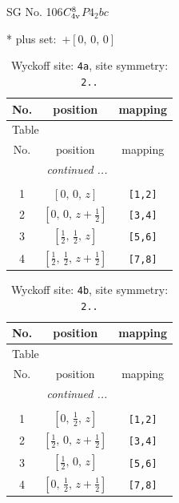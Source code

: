 \documentclass[fleqn,8pt]{jsarticle}
\begin{document}
\setcounter{MaxMatrixCols}{32}

\renewcommand{\tablename}{Table~}
\renewcommand{\figurename}{Figure~}
\begin{center}
\LARGE
SG No. 106\quad$C_{\rm 4v}^{8}$\quad$P4_2bc$\quad[ tetragonal ]
\end{center}
* plus set:\,\,\,$+\left[ 0,\, 0,\, 0 \right]$
\renewcommand{\arraystretch}{1.2}
\begin{longtable}{ccc}
\caption{Wyckoff site: {\tt 4a}, site symmetry: {\tt 2..}}
 \\
 \hline \hline
No. & position & mapping \\ \hline \endfirsthead

\multicolumn{2}{l}{\tablename\ \thetable{}} \\
 \hline \hline
No. & position & mapping \\ \hline \endhead

 \hline \hline
\multicolumn{2}{r}{\footnotesize\it continued ...} \\ \endfoot

 \hline \hline
\multicolumn{2}{r}{} \\ \endlastfoot

1 & $\left[ 0,\, 0,\, z \right]$ & {\tt [1,2]} \\ \hline
2 & $\left[ 0,\, 0,\, z + \frac{1}{2} \right]$ & {\tt [3,4]} \\ \hline
3 & $\left[ \frac{1}{2},\, \frac{1}{2},\, z \right]$ & {\tt [5,6]} \\ \hline
4 & $\left[ \frac{1}{2},\, \frac{1}{2},\, z + \frac{1}{2} \right]$ & {\tt [7,8]} \\
\end{longtable}
\renewcommand{\arraystretch}{1.2}
\begin{longtable}{ccc}
\caption{Wyckoff site: {\tt 4b}, site symmetry: {\tt 2..}}
 \\
 \hline \hline
No. & position & mapping \\ \hline \endfirsthead

\multicolumn{2}{l}{\tablename\ \thetable{}} \\
 \hline \hline
No. & position & mapping \\ \hline \endhead

 \hline \hline
\multicolumn{2}{r}{\footnotesize\it continued ...} \\ \endfoot

 \hline \hline
\multicolumn{2}{r}{} \\ \endlastfoot

1 & $\left[ 0,\, \frac{1}{2},\, z \right]$ & {\tt [1,2]} \\ \hline
2 & $\left[ \frac{1}{2},\, 0,\, z + \frac{1}{2} \right]$ & {\tt [3,4]} \\ \hline
3 & $\left[ \frac{1}{2},\, 0,\, z \right]$ & {\tt [5,6]} \\ \hline
4 & $\left[ 0,\, \frac{1}{2},\, z + \frac{1}{2} \right]$ & {\tt [7,8]} \\
\end{longtable}
\end{document}
